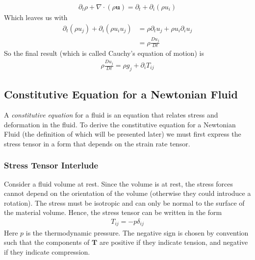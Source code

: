 \documentclass[a4paper, 12pt]{article}
\numberwithin{equation}{subsubsection}
\begin{document}
\begin{align*}
	\partial_t \rho + \nabla \cdot (\rho \mathbf{u}) = \partial_t + \partial_i (\rho u_i)
\end{align*}
Which leaves us with
\begin{align}
	\partial_t (\rho u_j) + \partial_i (\rho u_i u_j) &= \rho \partial_t u_j + \rho u_i \partial_i u_j \\
	&= \rho \frac{D u_j}{D t}
\end{align}
So the final result (which is called Cauchy's equation of motion) is
\begin{align}
	\rho \frac{D u_j}{D t} = \rho g_j + \partial_i T_{ij} \label{eq:N2_NS_cauchy_equation_of_motion}
\end{align}

\subsection{Constitutive Equation for a Newtonian Fluid}
A \textit{constitutive equation} for a fluid is an equation that relates stress and deformation in the fluid. To derive the constitutive equation for a Newtonian Fluid (the definition of which will be presented later) we must first express the stress tensor in a form that depends on the strain rate tensor.

\subsubsection{Stress Tensor Interlude}
Consider a fluid volume at rest. Since the volume is at rest, the stress forces cannot depend on the orientation of the volume (otherwise they could introduce a rotation). The stress must be isotropic and can only be normal to the surface of the material volume. Hence, the stress tensor can be written in the form
\begin{align}
	T_{ij} = - p \delta_{ij} \label{eq:N2_NS_stress_tensor_at_rest}
\end{align}
Here $p$ is the thermodynamic pressure. The negative sign is chosen by convention such that the components of $\mathbf{T}$ are positive if they indicate tension, and negative if they indicate compression.
\end{document}
